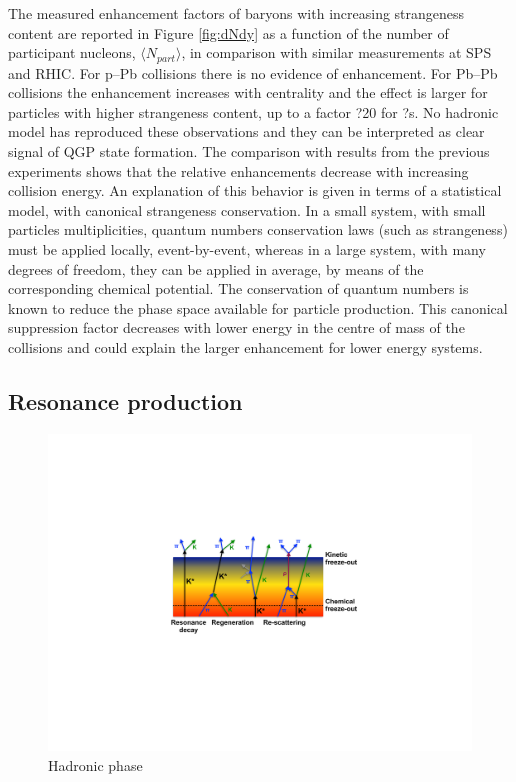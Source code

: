 The measured enhancement factors of baryons with increasing strangeness content are reported in Figure \ref{fig:dNdy} as a function of the number of participant nucleons, $\langle N_{part}\rangle$, in comparison with similar measurements at SPS and RHIC. For p--Pb collisions there is no evidence of enhancement. For Pb--Pb collisions the enhancement increases with centrality and the effect is larger for particles with higher strangeness content, up to a factor ?20 for ?s. No hadronic model has reproduced these observations and they can be interpreted as clear signal of QGP state formation. The comparison with results from the previous experiments shows that the relative enhancements decrease with increasing collision energy. An explanation of this behavior is given in terms of a statistical model, with canonical strangeness conservation. In a small system, with small particles multiplicities, quantum numbers conservation laws (such as strangeness) must be applied locally, event-by-event, whereas in a large system, with many degrees of freedom, they can be applied in average, by means of the corresponding chemical potential. The conservation of quantum numbers is known to reduce the phase space available for particle production. This canonical suppression factor decreases with lower energy in the centre of mass of the collisions and could explain the larger enhancement for lower energy systems.





\subsection{Resonance production}

\begin{figure}[htbp]
\begin{center}
\includegraphics[width=12.cm]{./Version1/FigChapter3/Hadronic}
\caption{Hadronic phase }
\label{fig:hadronic}
\end{center}
\end{figure}


